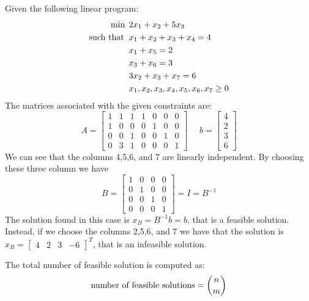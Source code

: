 \documentclass[12pt, a4paper]{report}
\begin{document}
    \begin{example}
        Given the following linear program: 
        \begin{align*}
            \min                      \:&\: 2x_1+x_2+5x_3          \\
            \textnormal{such that }     &\: x_1+x_2+x_3+x_4=4  \\
                                        &\: x_1+x_5=2  \\
                                        &\: x_3+x_6=3 \\
                                        &\: 3x_2+x_3+x_7=6  \\
                                        &\: x_1,x_2,x_3,x_4,x_5,x_6,x_7 \geq 0
        \end{align*}
        The matrices associated with the given constraints are: 
        \[
        A=
        \begin{bmatrix}
            1 & 1 & 1 & 1 & 0 & 0 & 0 \\
            1 & 0 & 0 & 0 & 1 & 0 & 0 \\
            0 & 0 & 1 & 0 & 0 & 1 & 0 \\
            0 & 3 & 1 & 0 & 0 & 0 & 1
        \end{bmatrix}
        \:\:\:\:\:\:
        b=
        \begin{bmatrix}
            4 \\
            2 \\
            3 \\
            6
        \end{bmatrix}
        \]
        We can see that the columns 4,5,6, and 7 are linearly independent. By choosing these three column we have 
        \[
        B= 
        \begin{bmatrix}
            1 & 0 & 0 & 0 \\
            0 & 1 & 0 & 0 \\
            0 & 0 & 1 & 0 \\
            0 & 0 & 0 & 1
        \end{bmatrix}
        =I=B^{-1}
        \]
        The solution found in this case is $x_B=B^{-1}b=b$, that is a feasible solution. Instead, if we choose the columns 2,5,6, and 7 we have that the solution is 
        $x_B=\begin{bmatrix} 4 & 2 & 3 & -6 \end{bmatrix}^T$, that is an infeasible solution. 
    \end{example}
    The total number of feasible solution is computed as: 
    \[\textnormal{number of feasible solutions}=\binom{n}{m}\]
\end{document}
